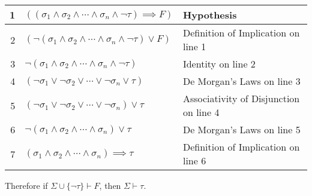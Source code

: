 \documentclass[12pt]{article}
\begin{document}
\begin{center}
    \begin{tabular}{r l l}
        1 & $((\sigma_1 \land \sigma_2 \land \cdots \land \sigma_n \land \lnot \tau) \implies F)$ & Hypothesis \\
        \hline
        2 & $(\lnot (\sigma_1 \land \sigma_2 \land \cdots \land \sigma_n \land \lnot \tau) \lor F)$ & Definition of Implication on line 1 \\
        3 & $\lnot (\sigma_1 \land \sigma_2 \land \cdots \land \sigma_n \land \lnot \tau)$ & Identity on line 2 \\
        4 & $(\lnot \sigma_1 \lor \lnot \sigma_2 \lor \cdots \lor \lnot \sigma_n \lor \tau)$ & De Morgan's Laws on line 3 \\
        5 & $(\lnot \sigma_1 \lor \lnot \sigma_2 \lor \cdots \lor \lnot \sigma_n) \lor \tau$ & Associativity of Disjunction on line 4 \\
        6 & $\lnot(\sigma_1 \land \sigma_2 \land \cdots \land \sigma_n) \lor \tau$ & De Morgan's Laws on line 5 \\
        \hline
        7 & $(\sigma_1 \land \sigma_2 \land \cdots \land \sigma_n) \implies \tau$ & Definition of Implication on line 6 
    \end{tabular}    
\end{center}

Therefore if $\Sigma \cup \{\lnot \tau\} \vdash F$, then $\Sigma \vdash \tau$.
\end{document}
